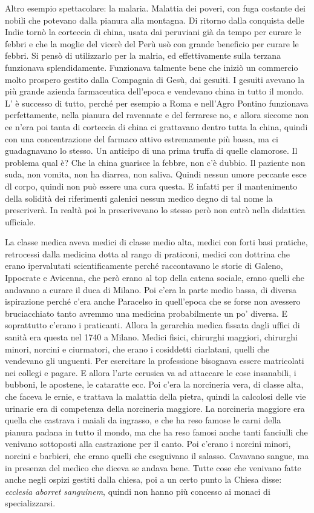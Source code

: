 \documentclass[]{article}
\begin{document}
Altro esempio spettacolare: la malaria. Malattia dei poveri, con fuga
costante dei nobili che potevano dalla pianura alla montagna. Di ritorno
dalla conquista delle Indie tornò la corteccia di china, usata dai
peruviani già da tempo per curare le febbri e che la moglie del vicerè
del Perù usò con grande beneficio per curare le febbri. Si pensò di
utilizzarlo per la malria, ed effettivamente sulla terzana funzionava
splendidamente. Funzionava talmente bene che iniziò un commercio molto
prospero gestito dalla Compagnia di Gesù, dai gesuiti. I gesuiti avevano
la più grande azienda farmaceutica dell'epoca e vendevano china in tutto
il mondo. L' è successo di tutto, perché per esempio a Roma e nell'Agro
Pontino funzionava perfettamente, nella pianura del ravennate e del
ferrarese no, e allora siccome non ce n'era poi tanta di corteccia di
china ci grattavano dentro tutta la china, quindi con una concentrazione
del farmaco attivo estremamente più bassa, ma ci guadagnavano lo stesso.
Un anticipo di una prima truffa di quelle clamorose. Il problema qual è?
Che la china guarisce la febbre, non c'è dubbio. Il paziente non suda,
non vomita, non ha diarrea, non saliva. Quindi nessun umore peccante
esce dl corpo, quindi non può essere una cura questa. E infatti per il
mantenimento della solidità dei riferimenti galenici nessun medico degno
di tal nome la prescriverà. In realtà poi la prescrivevano lo stesso
però non entrò nella didattica ufficiale.

La classe medica aveva medici di classe medio alta, medici con forti
basi pratiche, retrocessi dalla medicina dotta al rango di praticoni,
medici con dottrina che erano ipervalutati scientificamente perché
raccontavano le storie di Galeno, Ippocrate e Avicenna, che però erano
al top della catena sociale, erano quelli che andavano a curare il duca
di Milano. Poi c'era la parte medio bassa, di diversa ispirazione perché
c'era anche Paracelso in quell'epoca che se forse non avessero
bruciacchiato tanto avremmo una medicina probabilmente un po' diversa. E
soprattutto c'erano i praticanti. Allora la gerarchia medica fissata
dagli uffici di sanità era questa nel 1740 a Milano. Medici fisici,
chirurghi maggiori, chirurghi minori, norcini e ciurmatori, che erano i
cosiddetti ciarlatani, quelli che vendevano gli unguenti. Per esercitare
la professione bisognava essere matricolati nei collegi e pagare. E
allora l'arte cerusica va ad attaccare le cose insanabili, i bubboni, le
apostene, le cataratte ecc. Poi c'era la norcineria vera, di classe
alta, che faceva le ernie, e trattava la malattia della pietra, quindi
la calcolosi delle vie urinarie era di competenza della norcineria
maggiore. La norcineria maggiore era quella che castrava i maiali da
ingrasso, e che ha reso famose le carni della pianura padana in tutto il
mondo, ma che ha reso famosi anche tanti fanciulli che venivano
sottoposti alla castrazione per il canto. Poi c'erano i norcini minori,
norcini e barbieri, che erano quelli che eseguivano il salasso. Cavavano
sangue, ma in presenza del medico che diceva se andava bene. Tutte cose
che venivano fatte anche negli ospizi gestiti dalla chiesa, poi a un
certo punto la Chiesa disse: \emph{ecclesia aborret sanguinem}, quindi
non hanno più concesso ai monaci di specializzarsi.
\end{document}
